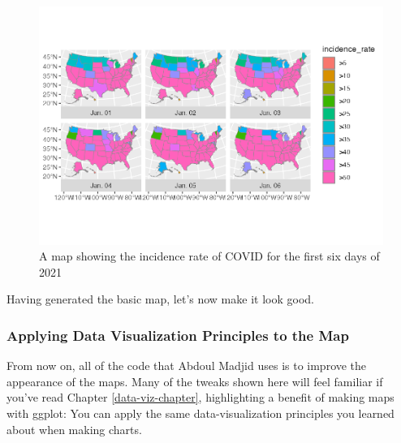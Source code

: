 \documentclass[
]{book}
\begin{document}
\begin{figure}
\includegraphics[width=1\linewidth]{maps_files/figure-latex/basic-map-1} \caption{A map showing the incidence rate of COVID for the first six days of 2021}\label{fig:basic-map}
\end{figure}

Having generated the basic map, let's now make it look good.

\hypertarget{applying-data-visualization-principles-to-the-map}{%
\subsubsection*{Applying Data Visualization Principles to the Map}\label{applying-data-visualization-principles-to-the-map}}

From now on, all of the code that Abdoul Madjid uses is to improve the appearance of the maps. Many of the tweaks shown here will feel familiar if you've read Chapter \ref{data-viz-chapter}, highlighting a benefit of making maps with ggplot: You can apply the same data-visualization principles you learned about when making charts.
\end{document}
